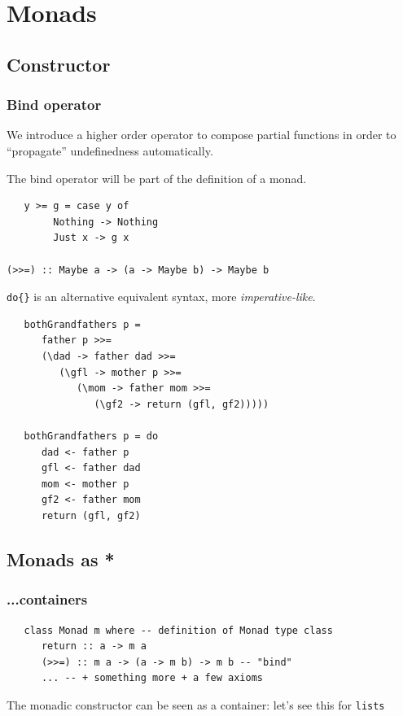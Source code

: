 \chapter{Monads}
\section{Constructor}
\subsection{Bind operator}


We introduce a higher order operator to
compose partial functions in order to
“propagate” undefinedness automatically.

The bind operator will be part of the definition
of a monad.

\begin{lstlisting}
   y >= g = case y of
        Nothing -> Nothing
        Just x -> g x

(>>=) :: Maybe a -> (a -> Maybe b) -> Maybe b
\end{lstlisting}

\lstinline|do{}| is an alternative equivalent syntax,
more \textit{imperative-like}.
\begin{lstlisting}
   bothGrandfathers p =
      father p >>= 
      (\dad -> father dad >>= 
         (\gfl -> mother p >>= 
            (\mom -> father mom >>= 
               (\gf2 -> return (gfl, gf2)))))
   
   bothGrandfathers p = do
      dad <- father p
      gfl <- father dad
      mom <- mother p
      gf2 <- father mom
      return (gfl, gf2)
\end{lstlisting}

\section{Monads as *}
\subsection{...containers}
\begin{lstlisting}
   class Monad m where -- definition of Monad type class
      return :: a -> m a
      (>>=) :: m a -> (a -> m b) -> m b -- "bind"
      ... -- + something more + a few axioms
\end{lstlisting}

The monadic constructor can be seen as a container:
let’s see this for \lstinline|lists|

